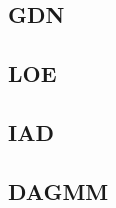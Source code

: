 \documentclass[../../main/main.tex]{subfiles}
\begin{document}
    \subsection{\acf{GDN}}
            

    \subsection{\acf{LOE}}\label{sect:contamination}
         

    \subsection{\acf{IAD}}
        

    \subsection{\acf{DAGMM}}
        
\end{document}
